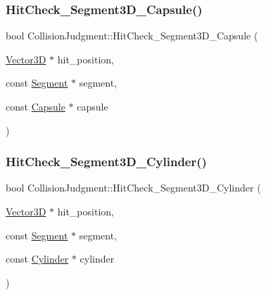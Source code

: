 \mbox{\label{class_collision_judgment_a21938f544146999d01d96f855277727b}} 
\subsubsection{\texorpdfstring{Hit\+Check\+\_\+\+Segment3\+D\+\_\+\+Capsule()}{HitCheck\_Segment3D\_Capsule()}}
{\footnotesize\ttfamily bool Collision\+Judgment\+::\+Hit\+Check\+\_\+\+Segment3\+D\+\_\+\+Capsule (\begin{DoxyParamCaption}\item[{\mbox{\hyperlink{class_vector3_d}{Vector3D}} $\ast$}]{hit\+\_\+position,  }\item[{const \mbox{\hyperlink{class_segment}{Segment}} $\ast$}]{segment,  }\item[{const \mbox{\hyperlink{class_capsule}{Capsule}} $\ast$}]{capsule }\end{DoxyParamCaption})\hspace{0.3cm}{\ttfamily [static]}}

\mbox{\label{class_collision_judgment_a61308e967a8569bcee4b25c74e28826d}} 
\subsubsection{\texorpdfstring{Hit\+Check\+\_\+\+Segment3\+D\+\_\+\+Cylinder()}{HitCheck\_Segment3D\_Cylinder()}}
{\footnotesize\ttfamily bool Collision\+Judgment\+::\+Hit\+Check\+\_\+\+Segment3\+D\+\_\+\+Cylinder (\begin{DoxyParamCaption}\item[{\mbox{\hyperlink{class_vector3_d}{Vector3D}} $\ast$}]{hit\+\_\+position,  }\item[{const \mbox{\hyperlink{class_segment}{Segment}} $\ast$}]{segment,  }\item[{const \mbox{\hyperlink{class_cylinder}{Cylinder}} $\ast$}]{cylinder }\end{DoxyParamCaption})\hspace{0.3cm}{\ttfamily [static]}}


